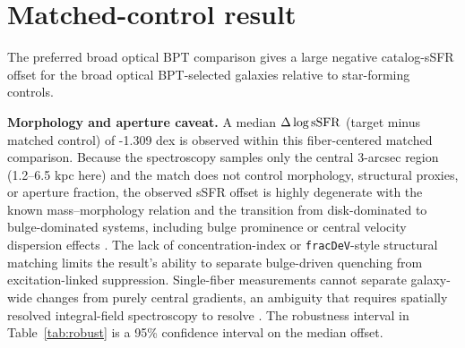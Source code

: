 \documentclass[twocolumn]{aastex631}
\begin{document}
\section{Matched-control result}
The preferred broad optical BPT comparison gives a large negative catalog-sSFR offset for the broad optical BPT-selected galaxies relative to star-forming controls.
\par\noindent\textbf{Morphology and aperture caveat.} A median $\Delta\log {\rm sSFR}$ (target minus matched control) of -1.309 dex is observed within this fiber-centered matched comparison. Because the spectroscopy samples only the central 3-arcsec region (1.2--6.5 kpc here) and the match does not control morphology, structural proxies, or aperture fraction, the observed sSFR offset is highly degenerate with the known mass--morphology relation and the transition from disk-dominated to bulge-dominated systems, including bulge prominence or central velocity dispersion effects \citep{schawinski2010,bluck2014,belfiore2016}. The lack of concentration-index or \texttt{fracDeV}-style structural matching limits the result's ability to separate bulge-driven quenching from excitation-linked suppression. Single-fiber measurements cannot separate galaxy-wide changes from purely central gradients, an ambiguity that requires spatially resolved integral-field spectroscopy to resolve \citep{penny2018,cheung2016}. The robustness interval in Table~\ref{tab:robust} is a 95\% confidence interval on the median offset.
\end{document}
